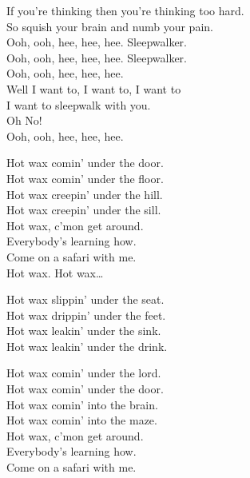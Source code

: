 If you're thinking then you're thinking too hard. \\
So squish your brain and numb your pain. \\

Ooh, ooh, hee, hee, hee. Sleepwalker. \\
Ooh, ooh, hee, hee, hee. Sleepwalker. \\
Ooh, ooh, hee, hee, hee. \\
Well I want to, I want to, I want to \\
I want to sleepwalk with you. \\
Oh No! \\
Ooh, ooh, hee, hee, hee. \\





Hot wax comin' under the door. \\
Hot wax comin' under the floor. \\
Hot wax creepin' under the hill. \\
Hot wax creepin' under the sill. \\

Hot wax, c'mon get around. \\
Everybody's learning how. \\
Come on a safari with me. \\

Hot wax. Hot wax… \\


Hot wax slippin' under the seat. \\
Hot wax drippin' under the feet. \\
Hot wax leakin' under the sink. \\
Hot wax leakin' under the drink. \\


Hot wax comin' under the lord. \\
Hot wax comin' under the door. \\
Hot wax comin' into the brain. \\
Hot wax comin' into the maze. \\

Hot wax, c'mon get around. \\
Everybody's learning how. \\
Come on a safari with me. \\

